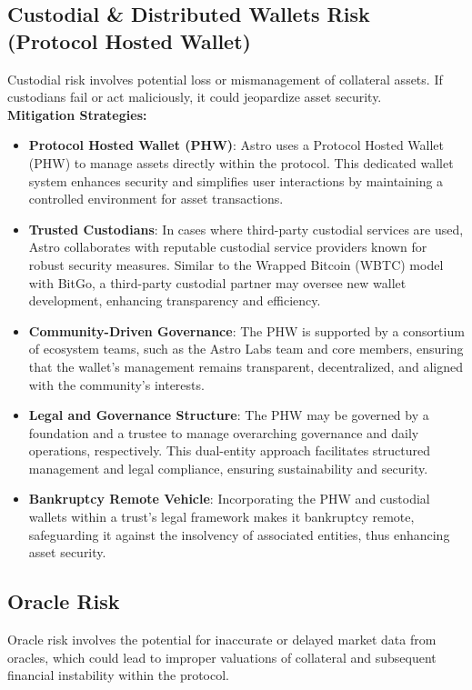 \subsection{Custodial \& Distributed Wallets Risk (Protocol Hosted Wallet)}
Custodial risk involves potential loss or mismanagement of collateral assets. If custodians fail or act maliciously, it could jeopardize asset security.\\


\textbf{Mitigation Strategies:}
\begin{itemize}
    \item \textbf{Protocol Hosted Wallet (PHW)}: Astro uses a Protocol Hosted Wallet (PHW) to manage assets directly within the protocol. This dedicated wallet system enhances security and simplifies user interactions by maintaining a controlled environment for asset transactions.
    \item \textbf{Trusted Custodians}: In cases where third-party custodial services are used, Astro collaborates with reputable custodial service providers known for robust security measures. Similar to the Wrapped Bitcoin (WBTC) model with BitGo, a third-party custodial partner may oversee new wallet development, enhancing transparency and efficiency.
    \item \textbf{Community-Driven Governance}: The PHW is supported by a consortium of ecosystem teams, such as the Astro Labs team and core members, ensuring that the wallet's management remains transparent, decentralized, and aligned with the community's interests.
    \item \textbf{Legal and Governance Structure}: The PHW may be governed by a foundation and a trustee to manage overarching governance and daily operations, respectively. This dual-entity approach facilitates structured management and legal compliance, ensuring sustainability and security.
    \item \textbf{Bankruptcy Remote Vehicle}: Incorporating the PHW and custodial wallets within a trust's legal framework makes it bankruptcy remote, safeguarding it against the insolvency of associated entities, thus enhancing asset security.
\end{itemize}

\subsection{Oracle Risk}
Oracle risk involves the potential for inaccurate or delayed market data from oracles, which could lead to improper valuations of collateral and subsequent financial instability within the protocol.\\


